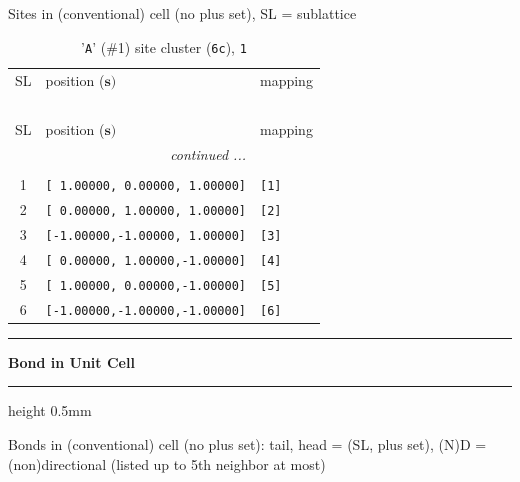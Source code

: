 \documentclass[fleqn,10pt,landscape]{jsarticle}
\begin{document}
\noindent Sites in (conventional) cell (no plus set), SL = sublattice

\renewcommand{\arraystretch}{1.6}
\begin{longtable}[l]{cll}
\captionsetup{justification=raggedright, singlelinecheck=off}
\caption{'\texttt{A}' (\#1) site cluster (\texttt{6c}), \texttt{1}}
 \\
 \hline \hline
SL & position ($\bm{s})$ & mapping \\ \hline \endfirsthead

\multicolumn{2}{l}{\tablename\ \thetable{}} \\
 \hline \hline
SL & position ($\bm{s})$ & mapping \\ \hline \endhead

 \hline \hline
\multicolumn{2}{r}{\footnotesize\it continued ...} \\ \endfoot

 \hline \hline
\multicolumn{2}{r}{} \\ \endlastfoot

1 & \texttt{[ 1.00000, 0.00000, 1.00000]} & \texttt{[1]} \\ \hline
2 & \texttt{[ 0.00000, 1.00000, 1.00000]} & \texttt{[2]} \\ \hline
3 & \texttt{[-1.00000,-1.00000, 1.00000]} & \texttt{[3]} \\ \hline
4 & \texttt{[ 0.00000, 1.00000,-1.00000]} & \texttt{[4]} \\ \hline
5 & \texttt{[ 1.00000, 0.00000,-1.00000]} & \texttt{[5]} \\ \hline
6 & \texttt{[-1.00000,-1.00000,-1.00000]} & \texttt{[6]} \\
\end{longtable}
\vspace{5mm}
\noindent \rule[0.5mm]{5mm}{0.5mm}\hspace{3mm}\textbf{Bond in Unit Cell}\hspace{3mm}\leaders\hrule height 0.5mm\hfill\kern0pt
\vspace{3mm}

\noindent Bonds in (conventional) cell (no plus set): tail, head = (SL, plus set), (N)D = (non)directional (listed up to 5th neighbor at most)
\end{document}
